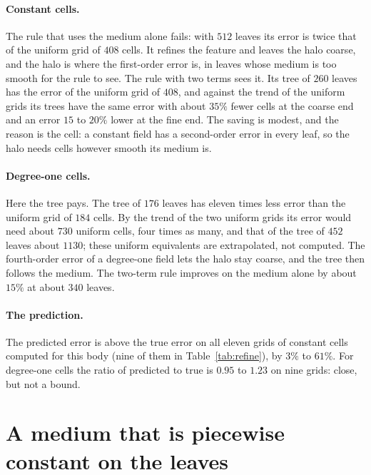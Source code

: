 \documentclass[11pt,a4paper]{article}
\begin{document}
\paragraph{Constant cells.} The rule that uses the medium alone fails: with $512$ leaves its error is
twice that of the uniform grid of $408$ cells. It refines the feature and leaves the halo coarse, and
the halo is where the first-order error is, in leaves whose medium is too smooth for the rule to see.
The rule with two terms sees it. Its tree of $260$ leaves has the error of the uniform grid of $408$,
and against the trend of the uniform grids its trees have the same error with about $35\%$ fewer cells
at the coarse end and an error $15$ to $20\%$ lower at the fine end. The saving is modest, and the
reason is the cell: a constant field has a second-order error in every leaf, so the halo needs cells
however smooth its medium is.

\paragraph{Degree-one cells.} Here the tree pays. The tree of $176$ leaves has eleven times less error than
the uniform grid of $184$ cells. By the trend of the two uniform grids its error would need about $730$
uniform cells, four times as many, and that of the tree of $452$ leaves about $1130$; these uniform
equivalents are extrapolated, not computed. The fourth-order error of a degree-one field lets the halo stay
coarse, and the tree then follows the medium. The two-term rule improves on the medium alone by about
$15\%$ at about $340$ leaves.

\paragraph{The prediction.} The predicted error is above the true error on all eleven grids of constant
cells computed for this body (nine of them in Table~\ref{tab:refine}), by $3\%$ to $61\%$. For degree-one
cells the ratio of predicted to true is $0.95$ to $1.23$ on nine grids: close, but not a bound.

\section{A medium that is piecewise constant on the leaves}\label{sec:blocky}
\end{document}
